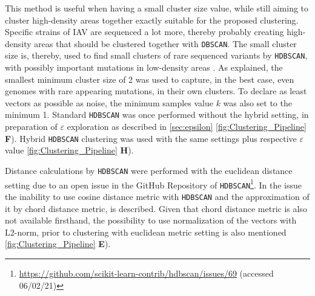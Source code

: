 This method is useful when having a small cluster size value, while still aiming to cluster high-density areas together exactly suitable for the proposed clustering. Specific strains of \gls{IAV} are sequenced a lot more, thereby probably creating high-density areas that should be clustered together with \texttt{DBSCAN}. The small cluster size is, thereby, used to find small clusters of rare sequenced variants by \texttt{HDBSCAN}, with possibly important mutations in low-density areas \autocite{malzer_hybrid_2020}. As explained, the smallest minimum cluster size of 2 was used to capture, in the best case, even genomes with rare appearing mutations, in their own clusters. To declare as least vectors as possible as noise, the minimum samples value $k$ was also set to the minimum 1. Standard \texttt{HDBSCAN} was once performed without the hybrid setting, in preparation of $\varepsilon$ exploration as described in \autoref{sec:epsilon} \autoref{fig:Clustering_Pipeline} \textsf{\textbf{F}}). Hybrid \texttt{HDBSCAN} clustering was used with the same settings plus respective $\varepsilon$ value \autoref{fig:Clustering_Pipeline} \textsf{\textbf{H}}).

\vspace{1em}

Distance calculations by \texttt{HDBSCAN} were performed with the euclidean distance setting due to an open issue in the GitHub Repository of \texttt{HDBSCAN}\footnote{\url{https://github.com/scikit-learn-contrib/hdbscan/issues/69} (accessed 06/02/21)}. In the issue the inability to use cosine distance metric with \texttt{HDBSCAN} and the approximation of it by chord distance metric, is described. Given that chord distance metric is also not available firsthand, the possibility to use normalization of the vectors with L2-norm, prior to clustering with euclidean metric setting is also mentioned \autoref{fig:Clustering_Pipeline} \textsf{\textbf{E}}). 

